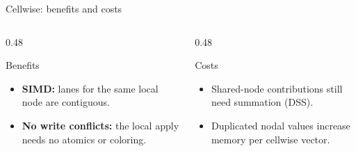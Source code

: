\documentclass[aspectratio=169,11pt]{beamer}
\begin{document}
\begin{frame}{Cellwise: benefits and costs}
  \vspace{-0.20cm}
  \begin{columns}[T,onlytextwidth]
    \begin{column}{0.48\textwidth}
      \begin{block}{Benefits}
        \small
        \begin{itemize}
          \setlength{\itemsep}{0.08cm}
          \item \textbf{SIMD:} lanes for the same local node are contiguous.
          \item \textbf{No write conflicts:} the local apply needs no
                atomics or coloring.
        \end{itemize}
      \end{block}
    \end{column}
    \begin{column}{0.48\textwidth}
      {
       \begin{block}{Costs}
         \small
         \begin{itemize}
           \setlength{\itemsep}{0.08cm}
           \item Shared-node contributions still need summation (DSS).
           \item Duplicated nodal values increase memory per cellwise vector.
         \end{itemize}
       \end{block}}
    \end{column}
  \end{columns}


\end{frame}
\end{document}
